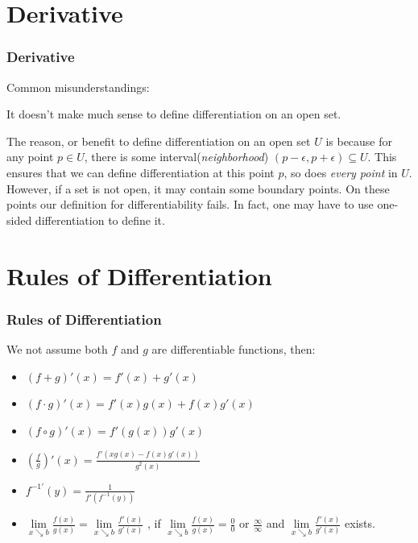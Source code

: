 \documentclass[12pt, t]{beamer}
\renewcommand{\emph}[1]{{\color{Turquoise3}\textsl{#1}}}
\begin{document}
\section{Derivative}
\begin{frame}
    \frametitle{Derivative}
    Common misunderstandings:\\
    \vspace{0.5em}
    \begin{center}
        It doesn't make much sense to define differentiation on an open set.
    \end{center}
    \vspace{0.5em}

    The reason, or benefit to define differentiation on an open set $U$ is because for any point $p\in U$,
    there is some interval(\emph{neighborhood}) $(p-\epsilon,p+\epsilon)\subseteq U$. This ensures that
    we can define differentiation at this point $p$, so does \emph{every point} in $U$.\\
    \vspace{1em}
    However, if a set is not open, it may contain some boundary points. On these points our definition for
    differentiability fails. In fact, one may have to use one-sided differentiation to define it.

\end{frame}

\section{Rules of Differentiation}
\begin{frame}
    \frametitle{Rules of Differentiation}
    We not assume both $f$ and $g$ are differentiable functions, then:
    \begin{itemize}
        \item $(f+g)'(x)=f'(x)+g'(x)$
              \vspace{1em}
        \item $(f\cdot g)'(x)=f'(x)g(x)+f(x)g'(x)$
              \vspace{1em}
        \item $(f\circ g)'(x)=f'(g(x))g'(x)$
              \vspace{1em}
        \item $(\frac{f}{g})'(x)=\frac{f'(xg(x)-f(x)g'(x))}{g^2(x)}$
              \vspace{1em}
        \item $f^{-1'}(y)=\frac{1}{f'(f^{-1}(y))}$
              \vspace{1em}
        \item $\underset{x\searrow b}{\lim}\frac{f(x)}{g(x)}=\underset{x\searrow b}{\lim}\frac{f'(x)}{g'(x)}$
              , if $\underset{x\searrow b}{\lim}\frac{f(x)}{g(x)}=\frac{0}{0}\text{ or }\frac{\infty}{\infty}$ and $\underset{x\searrow b}{\lim}\frac{f'(x)}{g'(x)}$ exists.
    \end{itemize}
\end{frame}
\end{document}
